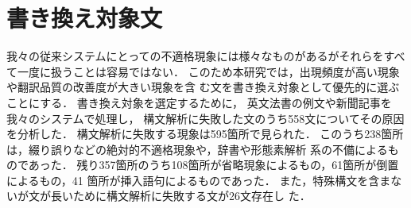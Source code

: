 \section{書き換え対象文}
\label{sec:object}

我々の従来システムにとっての不適格現象には様々なものがあるがそれらをすべ
て一度に扱うことは容易ではない．
このため本研究では，出現頻度が高い現象や翻訳品質の改善度が大きい現象を含
む文を書き換え対象として優先的に選ぶことにする．
書き換え対象を選定するために，
英文法書の例文や新聞記事\cite{Lewis97}を我々のシステムで処理し，
構文解析に失敗した文のうち558文についてその原因を分析した．
構文解析に失敗する現象は595箇所で見られた．
このうち238箇所は，綴り誤りなどの絶対的不適格現象や，辞書や形態素解析
系の不備によるものであった．
残り357箇所のうち108箇所が省略現象によるもの，61箇所が倒置によるもの，41
箇所が挿入語句によるものであった．
また，特殊構文を含まないが文が長いために構文解析に失敗する文が26文存在し
た．

